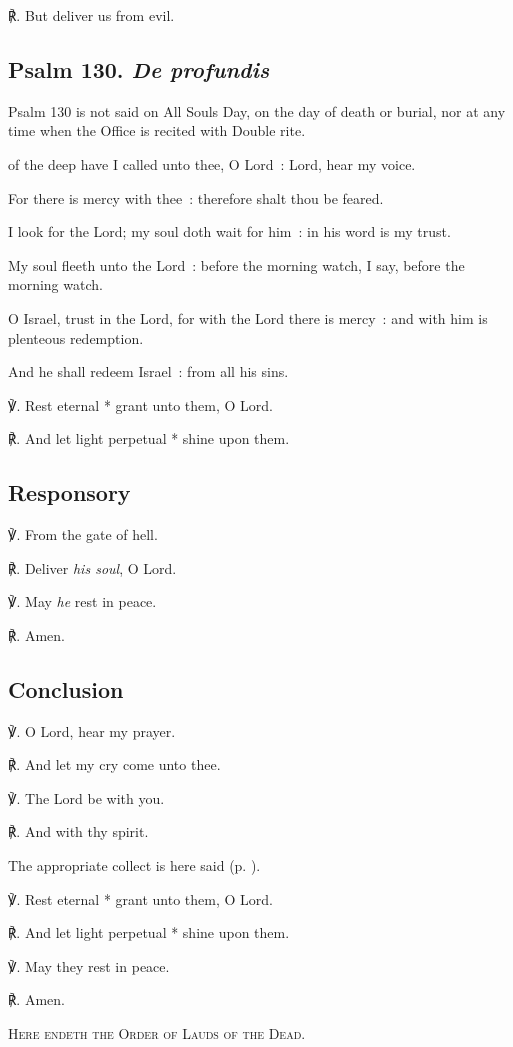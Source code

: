 ℟. But deliver us from evil.

\subsection{Psalm 130. \textit{De profundis}}
\begin{rubric}
{Psalm 130 is not said on All Souls Day, on the day of death or burial, nor at any time when the Office is recited with Double rite.}
\end{rubric}
 of the deep have I called unto thee, O Lord~: Lord, hear my voice.\par
{}
For there is mercy with thee~: therefore shalt thou be feared.\par
{}I look for the Lord; my soul doth wait for him~: in his word is my trust.\par
{}My soul fleeth unto the Lord~: before the morning watch, I say, before the morning watch.\par
{}O Israel, trust in the Lord, for with the Lord there is mercy~: and with him is plenteous redemption.\par
{}And he shall redeem Israel~: from all his sins.\par
℣. Rest eternal * grant unto them, O Lord.\par
℟. And let light perpetual * shine upon them.

\subsection{Responsory}
℣. From the gate of hell.

℟. Deliver \textit{his soul}, O Lord.

℣. May \textit{he} rest in peace.

℟. Amen.

\subsection{Conclusion}
℣. O Lord, hear my prayer.

℟. And let my cry come unto thee.

℣. The Lord be with you.

℟. And with thy spirit.

\begin{rubric}
{The appropriate collect is here said (p. \pageref{dead}).}
\end{rubric}

℣. Rest eternal * grant unto them, O Lord.

℟. And let light perpetual * shine upon them.

℣. May they rest in peace.

℟. Amen.

\begin{center}
    \textsc{Here endeth the Order of Lauds of the Dead.}
\end{center}